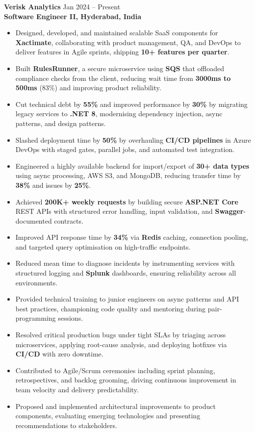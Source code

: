 \documentclass[letterpaper,10pt]{article}
\begin{document}
\textbf{Verisk Analytics} \hfill Jan 2024 -- Present \\
\textbf{Software Engineer II, Hyderabad, India}
\begin{itemize}[leftmargin=*]
    \item Designed, developed, and maintained scalable SaaS components for \textbf{Xactimate}, collaborating with product management, QA, and DevOps to deliver features in Agile sprints, shipping \textbf{10+ features per quarter}.
    \item Built \textbf{RulesRunner}, a secure microservice using \textbf{SQS} that offloaded compliance checks from the client, reducing wait time from \textbf{3000ms to 500ms} (83\%) and improving product reliability.
    \item Cut technical debt by \textbf{55\%} and improved performance by \textbf{30\%} by migrating legacy services to \textbf{.NET 8}, modernising dependency injection, async patterns, and design patterns.
    \item Slashed deployment time by \textbf{50\%} by overhauling \textbf{CI/CD pipelines} in Azure DevOps with staged gates, parallel jobs, and automated test integration.
    \item Engineered a highly available backend for import/export of \textbf{30+ data types} using async processing, AWS S3, and MongoDB, reducing transfer time by \textbf{38\%} and issues by \textbf{25\%}.
    \item Achieved \textbf{200K+ weekly requests} by building secure \textbf{ASP.NET Core} REST APIs with structured error handling, input validation, and \textbf{Swagger}-documented contracts.
    \item Improved API response time by \textbf{34\%} via \textbf{Redis} caching, connection pooling, and targeted query optimisation on high-traffic endpoints.
    \item Reduced mean time to diagnose incidents by instrumenting services with structured logging and \textbf{Splunk} dashboards, ensuring reliability across all environments.
    \item Provided technical training to junior engineers on async patterns and API best practices, championing code quality and mentoring during pair-programming sessions.
    \item Resolved critical production bugs under tight SLAs by triaging across microservices, applying root-cause analysis, and deploying hotfixes via \textbf{CI/CD} with zero downtime.
    \item Contributed to Agile/Scrum ceremonies including sprint planning, retrospectives, and backlog grooming, driving continuous improvement in team velocity and delivery predictability.
    \item Proposed and implemented architectural improvements to product components, evaluating emerging technologies and presenting recommendations to stakeholders.
\end{itemize}
\end{document}

